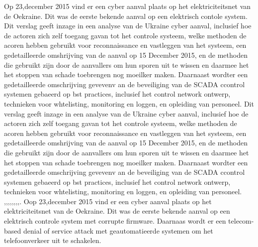 Op 23,december 2015  vind er een cyber aanval plaats op het elektriciteitsnet van de Oekraine. Dit was de eerste bekende aanval op een elektrisch contole  system.  Dit verslag geeft inzage in een analyse van de Ukraine cyber aanval,
inclusief hoe de actoren zich zelf toegang gavan tot het controle systeem, welke methoden de acoren hebben gebruikt voor reconnaissance en vastleggen van het systeem, een gedetailleerde omshrijving van de aanval op 15 December 2015, en de methoden die gebruikt zijn door de aanvallers om hun sporen uit te wissen en daarmee het het stoppen van schade toebrengen  nog moeilker maken. Daarnaast wordter  een gedetailleerde omschrijving gevevenv an de beveiliging van de SCADA ccontrol systemen gebaeerd op bst practices, inclusief het control network ontwerp, technieken voor whtelisting, monitoring en loggen, en  opleiding van personeel.
\cite{Whitehead2017ukrainepoweroutage}
\cite{noauthor_2022-nm}
\cite{zetter2016GridHack}
\cite{owens21032017ukrainemitigationstrategies}
\cite{cerulus2019FrontlineRussiaAttack}
\cite{grammatikis2019AttackIEC6087505104}
\cite{hidajat2016ScadaSimulator}
\cite{uscert20072021crashmalware}
\cite{zetter12062017malwareanalysis}
\cite{icsRussianHackingCyberWeapon}
\cite{usgovC2M2}
Dit verslag geeft inzage in een analyse van de Ukraine cyber aanval,
inclusief hoe de actoren zich zelf toegang gavan tot het controle systeem, welke methoden de acoren hebben gebruikt voor reconnaissance en vastleggen van het systeem, een gedetailleerde omshrijving van de aanval op 15 December 2015, en de methoden die gebruikt zijn door de aanvallers om hun sporen uit te wissen en daarmee het het stoppen van schade toebrengen  nog moeilker maken. Daarnaast wordter  een gedetailleerde omschrijving gevevenv an de beveiliging van de SCADA ccontrol systemen gebaeerd op bst practices, inclusief het control network ontwerp, technieken voor whtelisting, monitoring en loggen, en  opleiding van personeel.
\cite{Whitehead2017ukrainepoweroutage},\cite{zetter2016GridHack},\cite{boozallen2016lightwentout},\cite{finklejan2016UsBlamesRussianSandworm},\cite{desarnaud2017cyberattacks},\cite{caseli04112016intrusiondetectioncontrolsystem},\cite{rochascadatesting},\cite{hidajat2016ScadaSimulator},\cite{zetter2017moreDangerousMalware}.
Oop 23,december 2015  vind er een cyber aanval plaats op het elektriciteitsnet van de Oekraine. Dit was de eerste bekende aanval op een elektrisch controle  system met corrupte firmware. Daarnaas wordt er een telecom-based denial of service attack met  geautomatieerde systemen om het telefoonverkeer uit te schakelen.
\cite{Whitehead2017ukrainepoweroutage}
